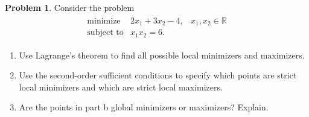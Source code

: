 \documentclass[12pt]{article}
\theoremstyle{definition}
\newtheorem{problem}{Problem}
\begin{document}
\begin{problem}
  Consider the problem
  \begin{align*}
    \begin{array}{rll}
      \text{minimize} & 2x_1 + 3x_2 - 4, & x_1, x_2 \in \mathbb{R} \\
      \text{subject to} & x_1 x_2 = 6.&
    \end{array}
  \end{align*}

  \begin{enumerate}
    \item Use Lagrange's theorem to find all possible local minimizers and maximizers.
    \item Use the second-order sufficient conditions to specify which points are strict
      local minimizers and which are strict local maximizers.
    \item Are the points in part b global minimizers or maximizers? Explain.
  \end{enumerate}
\end{problem}
\end{document}

